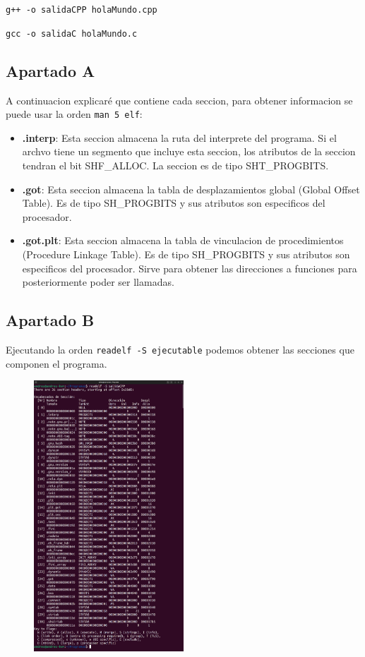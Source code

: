 \documentclass{article}
\begin{document}
\verb|g++ -o salidaCPP holaMundo.cpp|

\verb|gcc -o salidaC holaMundo.c|


\subsection*{Apartado A}
A continuacion explicaré que contiene cada seccion, para obtener informacion se puede usar la orden \verb|man 5 elf|:

\begin{itemize}
    \item \textbf{.interp}: Esta seccion almacena la ruta del interprete del programa. Si el archvo tiene un segmento que incluye esta seccion, los atributos de la seccion tendran el bit SHF\_ALLOC. La seccion es de tipo SHT\_PROGBITS.
    
    \item \textbf{.got}: Esta seccion almacena la tabla de desplazamientos global (Global Offset Table). Es de tipo SH\_PROGBITS y sus atributos son especificos del procesador. 
    
    \item \textbf{.got.plt}: Esta seccion almacena la tabla de vinculacion de procedimientos (Procedure Linkage Table). Es de tipo SH\_PROGBITS y sus atributos son especificos del procesador. Sirve para obtener las direcciones a funciones para posteriormente poder ser llamadas.
\end{itemize}


\subsection*{Apartado B}

Ejecutando la orden \verb|readelf -S ejecutable| podemos obtener las secciones que componen el programa.

\begin{figure}[H]
    \centering
    \includegraphics[width=0.5\textwidth]{imagenes/CPP/merged.png}
\end{figure}
\end{document}
